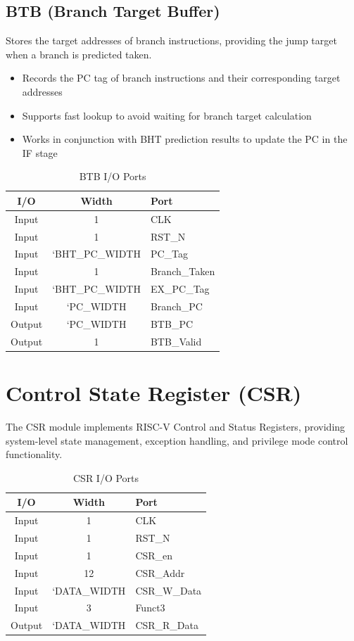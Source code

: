 \documentclass[12pt,a4paper]{report}
\begin{document}
\newpage

\subsection{BTB (Branch Target Buffer)}

Stores the target addresses of branch instructions, providing the jump target when a branch is predicted taken.

\begin{itemize}
    \item Records the PC tag of branch instructions and their corresponding target addresses
    \item Supports fast lookup to avoid waiting for branch target calculation
    \item Works in conjunction with BHT prediction results to update the PC in the IF stage
\end{itemize}

\begin{table}[htbp]
\centering
\caption{BTB I/O Ports}
\begin{tabular}{|c|c|l|}
\hline
\textbf{I/O} & \textbf{Width} & \textbf{Port} \\
\hline
Input & 1 & CLK \\
Input & 1 & RST\_N \\
Input & `BHT\_PC\_WIDTH & PC\_Tag \\
Input & 1 & Branch\_Taken \\
Input & `BHT\_PC\_WIDTH & EX\_PC\_Tag \\
Input & `PC\_WIDTH & Branch\_PC \\
Output & `PC\_WIDTH & BTB\_PC \\
Output & 1 & BTB\_Valid \\
\hline
\end{tabular}
\end{table}

\newpage

\section{Control State Register (CSR)}

The CSR module implements RISC-V Control and Status Registers, providing system-level state management, exception handling, and privilege mode control functionality.

\begin{table}[htbp]
\centering
\caption{CSR I/O Ports}
\begin{tabular}{|c|c|l|}
\hline
\textbf{I/O} & \textbf{Width} & \textbf{Port} \\
\hline
Input & 1 & CLK \\
Input & 1 & RST\_N \\
Input & 1 & CSR\_en \\
Input & 12 & CSR\_Addr \\
Input & `DATA\_WIDTH & CSR\_W\_Data \\
Input & 3 & Funct3 \\
Output & `DATA\_WIDTH & CSR\_R\_Data \\
\hline
\end{tabular}
\end{table}
\end{document}
